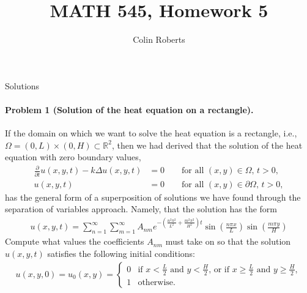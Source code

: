 \documentclass[leqno]{article}
\author{Colin Roberts}
\title{MATH 545, Homework 5}
\theoremstyle{nonumberplain}
\newcommand{\R}{\mathbb{R}}
\begin{document}
\maketitle
\begin{large}
\begin{center}
Solutions
\end{center}
\end{large}


\paragraph{Problem 1 (Solution of the heat equation on a rectangle).}
If the domain on which we want to solve the heat equation is a
rectangle, i.e., $\Omega=(0,L)\times(0,H) \subset \R^2$, then we had
derived that the solution of the heat equation with zero boundary
values,
\begin{align*}
\frac{\partial}{\partial t} u(x,y,t)
-
k
\Delta u(x,y,t)
&= 0
\qquad \text{for all $(x,y)\in\Omega$, $t>0$},
\\
u(x,y,t) &= 0
\qquad \text{for all $(x,y)\in\partial\Omega$, $t>0$},
\end{align*}
has the general form of a superposition of solutions we have found
through the separation of variables approach. Namely, that the
solution has the form
\begin{align*}
u(x,y,t)
=
\sum_{n=1}^\infty
\sum_{m=1}^\infty
A_{nm}
e^{-\left(\frac{n^2\pi^2}{L^2} + \frac{m^2\pi^2}{H^2}\right)t}
\sin\left(\frac{n\pi x}{L}\right)
\sin\left(\frac{m\pi y}{H}\right)
\end{align*}
Compute what values the coefficients $A_{nm}$ must take on so that the
solution $u(x,y,t)$ satisfies the following initial conditions:
\begin{align*}
u(x,y,0)
= u_0(x,y)
= \begin{cases}
  0 & \text{if $x<\frac L2$ and $y<\frac H2$, or if $x\ge\frac L2$ and
    $y\ge\frac H2$},
    \\
    1 & \text{otherwise}.
\end{cases}
\end{align*}
\end{document}
